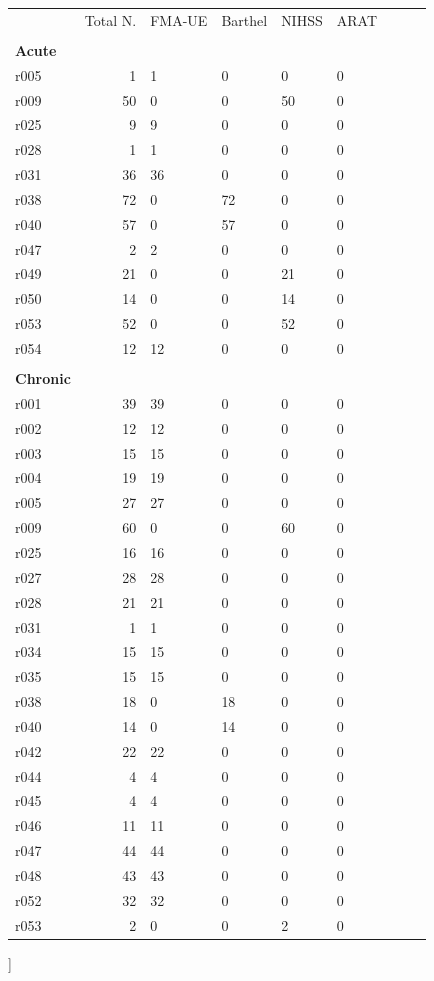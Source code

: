 \documentclass[phd,tocprelim]{cornell}
\renewcommand{\caption}[1]{\singlespacing\hangcaption{#1}\normalspacing}
\begin{document}
\begin{table}[h]
\centering
\begin{scriptsize}
\begin{tabular}{lrlllllll}
\toprule
 & Total N. & FMA-UE  & Barthel & NIHSS  & ARAT \\
 & & &  &  \\
 \textbf{Acute}  & & & & & \\
r005 & 1 & 1 & 0 & 0 & 0 \\
r009 & 50 & 0 & 0 & 50 & 0 \\
r025 & 9 & 9 & 0 & 0 & 0 \\
r028 & 1 & 1 & 0 & 0 & 0 \\
r031 & 36 & 36 & 0 & 0 & 0 \\
r038 & 72 & 0 & 72 & 0 & 0 \\
r040 & 57 & 0 & 57 & 0 & 0 \\
r047 & 2 & 2 & 0 & 0 & 0 \\
r049 & 21 & 0 & 0 & 21 & 0 \\
r050 & 14 & 0 & 0 & 14 & 0 \\
r053 & 52 & 0 & 0 & 52 & 0 \\
r054 & 12 & 12 & 0 & 0 & 0 \\

& & & & & \\
 \textbf{Chronic}  & & & & & \\
r001 & 39 & 39 & 0 & 0 & 0 \\
r002 & 12 & 12 & 0 & 0 & 0 \\
r003 & 15 & 15 & 0 & 0 & 0 \\
r004 & 19 & 19 & 0 & 0 & 0 \\
r005 & 27 & 27 & 0 & 0 & 0 \\
r009 & 60 & 0 & 0 & 60 & 0 \\
r025 & 16 & 16 & 0 & 0 & 0 \\
r027 & 28 & 28 & 0 & 0 & 0 \\
r028 & 21 & 21 & 0 & 0 & 0 \\
r031 & 1 & 1 & 0 & 0 & 0 \\
r034 & 15 & 15 & 0 & 0 & 0 \\
r035 & 15 & 15 & 0 & 0 & 0 \\
r038 & 18 & 0 & 18 & 0 & 0 \\
r040 & 14 & 0 & 14 & 0 & 0 \\
r042 & 22 & 22 & 0 & 0 & 0 \\
r044 & 4 & 4 & 0 & 0 & 0 \\
r045 & 4 & 4 & 0 & 0 & 0 \\
r046 & 11 & 11 & 0 & 0 & 0 \\
r047 & 44 & 44 & 0 & 0 & 0 \\
r048 & 43 & 43 & 0 & 0 & 0 \\
r052 & 32 & 32 & 0 & 0 & 0 \\
r053 & 2 & 0 & 0 & 2 & 0 \\
\bottomrule


\end{tabular}
\end{scriptsize}
		\ContinuedFloat
		\captionsetup{labelformat=adja-page}
		    \caption[]{}
\end{table}
\end{document}
